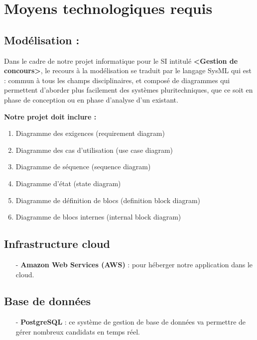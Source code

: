 \section{Moyens technologiques requis}
\subsection{Modélisation :}
\setlength{\parindent}{5ex}

Dans le cadre de notre projet informatique pour le SI intitulé \textbf{<Gestion de concours>}, 
le recours à la modélisation se traduit par le langage SysML qui est :
commun à tous les champs disciplinaires, et composé de diagrammes qui permettent d’aborder
plus facilement des systèmes pluritechniques, que ce soit en phase de conception ou en phase 
d’analyse d’un existant.\par

\textbf{Notre projet doit inclure : }
\begin{enumerate}
	\item Diagramme des exigences (requirement diagram)
	\item Diagramme des cas d’utilisation (use case diagram)
	\item Diagramme de séquence (sequence diagram)
	\item Diagramme d’état (state diagram)
	\item Diagramme de définition de blocs (definition block diagram)
	\item Diagramme de blocs internes (internal block diagram)
\end{enumerate}

\subsection{Infrastructure cloud}
\begin{itemize}
	\item[-] \textbf{Amazon Web Services (AWS)} : pour héberger notre application dans le cloud.
\end{itemize}

\subsection{Base de données}
\begin{itemize}
	\item[-] \textbf{PostgreSQL} : ce système de gestion de base de données va permettre de gérer 
	nombreux candidats en temps réel.
\end{itemize}

